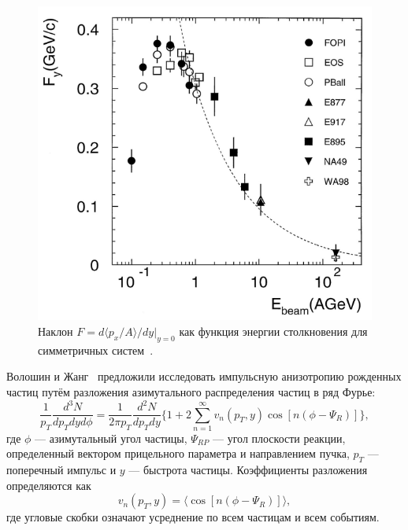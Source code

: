 \begin{figure}
    \centering
    \includegraphics[width=0.55\linewidth]{images/Fy_summary.png}
    \caption{Наклон $F=d\langle p_x /A \rangle / dy|_{y=0}$ как функция энергии столкновения для симметричных систем~\cite{Herrmann:1999wu}.}
    \label{fig:Fy_summary}
\end{figure}

Волошин и Жанг~\cite{Voloshin:1994mz, Poskanzer:1998yz} предложили исследовать импульсную анизотропию рожденных частиц путём разложения азимутального распределения частиц в ряд Фурье:
%
\begin{equation}
    \frac{1}{p_T}\frac{d^3 N}{dp_T dy d\phi} = 
    \frac{ 1 }{2\pi p_T} \frac{ d^2 N }{dp_T dy} \{
    1 + 2\sum_{n=1}^{\infty} v_n(p_T,y) \cos[ n ( \phi - \Psi_R ) ]
    \},
\end{equation}
%
где $\phi$ --- азимутальный угол частицы, $\Psi_{RP}$ --- угол плоскости реакции, определенный вектором прицельного параметра и направлением пучка, $p_T$ --- поперечный импульс и $y$ --- быстрота частицы.
Коэффициенты разложения определяются как 
%
\begin{equation}
    v_n(p_T,y) = \langle  \cos[ n ( \phi - \Psi_R ) ] \rangle,
\end{equation}
%
где угловые скобки означают усреднение по всем частицам и всем событиям. 

